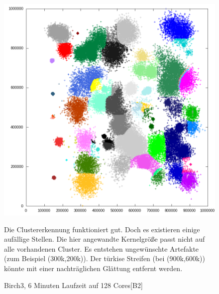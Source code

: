 	\begin{figure}[H]
		\centering
		\includegraphics[scale=0.71]{../meanshift/output/pics/birch3_colored.png} 
		\vspace{-5pt}
		\caption{Birch3, 6 Minuten Laufzeit auf 128 Cores[B2]}
			Die Clustererkennung funktioniert gut. Doch es existieren einige aufällige Stellen.
			Die hier angewandte Kernelgröße passt nicht auf alle vorhandenen Cluster. Es entstehen ungewünschte Artefakte (zum Beispiel (300k,200k)).
			Der türkise Streifen (bei (900k,600k)) könnte mit einer nachträglichen Glättung entfernt werden.
	\end{figure}
	\newpage
